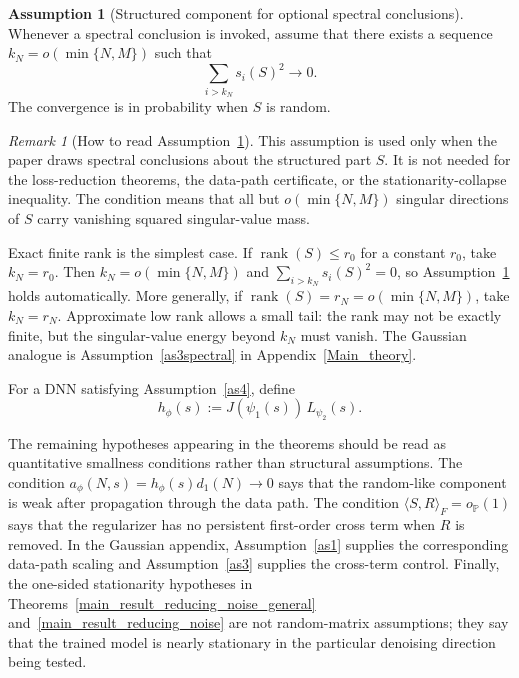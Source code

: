 \documentclass[11pt]{article}
\theoremstyle{plain}
\theoremstyle{definition}
\newtheorem{assumption}[thm]{Assumption}
\theoremstyle{remark}
\newtheorem{rem}[thm]{Remark}
\newcommand{\PP}{\mathbb{P}}
\newcommand{\rank}{\operatorname{rank}}
\newcommand{\1}{\mathbf{1}}
\begin{document}
\begin{assumption}[Structured component for optional spectral conclusions]
\label{as6}
Whenever a spectral conclusion is invoked, assume that there exists a sequence \(k_N=o(\min\{N,M\})\) such that
\[
\sum_{i>k_N}s_i(S)^2\to0.
\]
The convergence is in probability when \(S\) is random.
\end{assumption}

\begin{rem}[How to read Assumption~\ref{as6}]
This assumption is used only when the paper draws spectral conclusions about the structured part \(S\).  It is not needed for the loss-reduction theorems, the data-path certificate, or the stationarity-collapse inequality.  The condition means that all but \(o(\min\{N,M\})\) singular directions of \(S\) carry vanishing squared singular-value mass.

Exact finite rank is the simplest case.  If \(\rank(S)\le r_0\) for a constant \(r_0\), take \(k_N=r_0\).  Then \(k_N=o(\min\{N,M\})\) and \(\sum_{i>k_N}s_i(S)^2=0\), so Assumption~\ref{as6} holds automatically.  More generally, if \(\rank(S)=r_N=o(\min\{N,M\})\), take \(k_N=r_N\).  Approximate low rank allows a small tail: the rank may not be exactly finite, but the singular-value energy beyond \(k_N\) must vanish.  The Gaussian analogue is Assumption~\ref{as3spectral} in Appendix~\ref{Main_theory}.
\end{rem}

For a DNN satisfying Assumption~\ref{as4}, define
\begin{equation}
\label{from_DNN_st_2}
h_\phi(s):=J(\psi_1(s))\,L_{\psi_2}(s).
\end{equation}

The remaining hypotheses appearing in the theorems should be read as quantitative smallness conditions rather than structural assumptions.  The condition \(a_\phi(N,s)=h_\phi(s)d_1(N)\to0\) says that the random-like component is weak after propagation through the data path.  The condition \(\langle S,R\rangle_F=o_{\PP}(1)\) says that the regularizer has no persistent first-order cross term when \(R\) is removed.  In the Gaussian appendix, Assumption~\ref{as1} supplies the corresponding data-path scaling and Assumption~\ref{as3} supplies the cross-term control.  Finally, the one-sided stationarity hypotheses in Theorems~\ref{main_result_reducing_noise_general} and~\ref{main_result_reducing_noise} are not random-matrix assumptions; they say that the trained model is nearly stationary in the particular denoising direction being tested.
\end{document}
